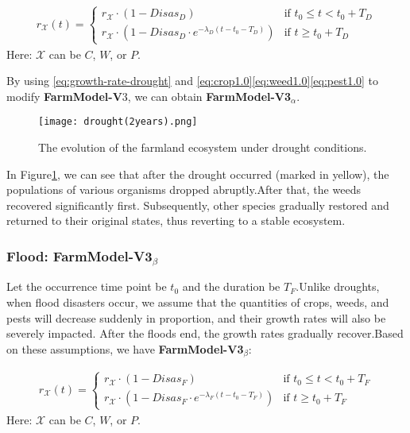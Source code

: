\documentclass[12pt]{article}  %
\begin{document}
\begin{equation}
    \begin{aligned}
    r_{\mathcal X}(t) = 
    \begin{cases} 
    r_{\mathcal X} \cdot (1 - Disas_D) & \text{if } t_0 \leq t < t_0 + T_D \\
    r_{\mathcal X} \cdot \left(1 - Disas_D \cdot e^{-\lambda_D (t - t_0 - T_D)}\right) & \text{if } t \geq t_0 + T_D
    \end{cases}
    \end{aligned}\label{eq:growth-rate-drought}
\end{equation}
Here: $\mathcal X$ can be $C$, $W$, or $P$.

By using \eqref{eq:growth-rate-drought} and \eqref{eq:crop1.0}\eqref{eq:weed1.0}\eqref{eq:pest1.0}
to modify \textbf{FarmModel-V$3$}, we can obtain \textbf{FarmModel-V3$_{\alpha}$}.
\begin{figure}
    \centering
    \texttt{[image: drought(2years).png]}
    \caption{The evolution of the farmland ecosystem under drought conditions.}
    \label{fig:Drought Influence}
\end{figure}
In Figure\ref{fig:Drought Influence}, we can see that 
after the drought occurred (marked in yellow), the populations 
of various organisms dropped abruptly.After that, the weeds 
recovered significantly first. Subsequently, other species 
gradually restored and returned to their original states, 
thus reverting to a stable ecosystem.


\subsubsection{Flood: FarmModel-V3$_{\beta}$}
Let the occurrence time point be $t_0$ and the duration be $T_F$.Unlike 
droughts, when flood disasters occur, we assume that the quantities of 
crops, weeds, and pests will decrease suddenly in proportion, and their 
growth rates will also be severely impacted. After the floods end, the 
growth rates gradually recover.Based on these assumptions, we have
\textbf{FarmModel-V3$_{\beta}$}:

\begin{equation}
    \begin{aligned}
    r_{\mathcal X}(t) = 
    \begin{cases} 
    r_{\mathcal X} \cdot (1 - Disas_F) & \text{if } t_0 \leq t < t_0 + T_F \\
    r_{\mathcal X} \cdot \left(1 - Disas_F \cdot e^{-\lambda_F (t - t_0 - T_F)}\right) & \text{if } t \geq t_0 + T_F
    \end{cases}
    \end{aligned}\label{eq:growth-rate-flood}
\end{equation}
Here: $\mathcal X$ can be $C$, $W$, or $P$.
\end{document}
